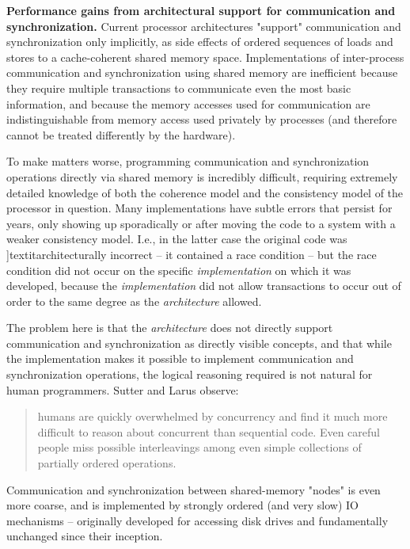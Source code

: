    \item \textbf{Performance gains from architectural support for
  communication and synchronization.}  Current processor architectures
     "support" communication and synchronization only implicitly, as
     side effects of ordered sequences of loads and stores to a
     cache-coherent shared memory space.  Implementations of
     inter-process communication and synchronization using shared
     memory are inefficient because they require multiple transactions
     to communicate even the most basic information, and because the
     memory accesses used for communication are indistinguishable from
     memory access used privately by processes (and therefore cannot
     be treated differently by the hardware).
     
     To make matters worse, programming communication and
     synchronization operations directly via shared memory is
     incredibly difficult, requiring extremely detailed knowledge of
     both the coherence model and the consistency model of the
     processor in question.  Many implementations have subtle errors
     that persist for years, only showing up sporadically or after
     moving the code to a system with a weaker consistency
     model. I.e., in the latter case the original code was
     ]textit{architecturally} incorrect -- it contained a race
       condition -- but the race condition did not occur on the
       specific \textit{implementation} on which it was developed,
       because the \textit{implementation} did not allow transactions
       to occur out of order to the same degree as the
       \textit{architecture} allowed.
     
     The problem here is that the \textit{architecture} does not
     directly support communication and synchronization as directly
     visible concepts, and that while the implementation makes it
     possible to implement communication and synchronization
     operations, the logical reasoning required is not natural for
     human programmers.  Sutter and Larus observe:
 \begin{quote}
   humans are quickly overwhelmed by concurrency and find it much more
   difficult to reason about concurrent than sequential code. Even
   careful people miss possible interleavings among even simple
   collections of partially ordered operations.  \cite{Sutter_2005}
 \end{quote}
     
     Communication and synchronization between shared-memory "nodes"
     is even more coarse, and is implemented by strongly ordered (and
     very slow) IO mechanisms -- originally developed for accessing
     disk drives and fundamentally unchanged since their inception.
     
